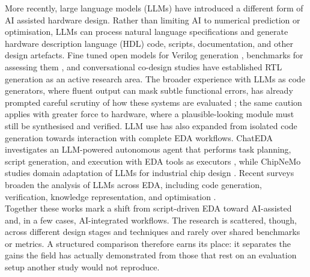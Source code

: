 \documentclass[conference]{IEEEtran}
\begin{document}
\noindent More recently, large language models (LLMs) have introduced a different form of AI assisted hardware design. Rather than limiting AI to numerical prediction or optimisation, LLMs can process natural language specifications and generate hardware description language (HDL) code, scripts, documentation, and other design artefacts. Fine tuned open models for Verilog generation \cite{P11_Thakur2024,P4_Liu2025}, benchmarks for assessing them \cite{P12_Liu2023,P15_Pinckney2025}, and conversational co-design studies \cite{P13_Blocklove2023} have established RTL generation as an active research area. The broader experience with LLMs as code generators, where fluent output can mask subtle functional errors, has already prompted careful scrutiny of how these systems are evaluated \cite{10.1007/s10844-025-00968-y}; the same caution applies with greater force to hardware, where a plausible-looking module must still be synthesised and verified. LLM use has also expanded from isolated code generation towards interaction with complete EDA workflows. ChatEDA investigates an LLM-powered autonomous agent that performs task planning, script generation, and execution with EDA tools as executors \cite{P5_Wu2024}, while ChipNeMo studies domain adaptation of LLMs for industrial chip design \cite{P14_Liu2023ChipNeMo}. Recent surveys broaden the analysis of LLMs across EDA, including code generation, verification, knowledge representation, and optimisation \cite{P6_Pan2025,P7_He2025}.\\

\noindent Together these works mark a shift from script-driven EDA toward AI-assisted and, in a few cases, AI-integrated workflows. The research is scattered, though, across different design stages and techniques and rarely over shared benchmarks or metrics. A structured comparison therefore earns its place: it separates the gains the field has actually demonstrated from those that rest on an evaluation setup another study would not reproduce.\\
\end{document}
